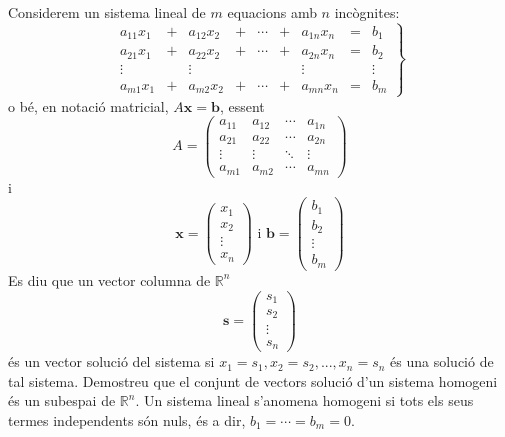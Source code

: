 \begin{exemple}
Considerem un sistema lineal de $m$ equacions amb $n$ incògnites:%
\begin{equation*}
\left. 
\begin{array}{ccccccccc}
a_{11}x_{1} & + & a_{12}x_{2} & + & \cdots & + & a_{1n}x_{n} & = & b_{1} \\ 
a_{21}x_{1} & + & a_{22}x_{2} & + & \cdots & + & a_{2n}x_{n} & = & b_{2} \\ 
\vdots &  & \vdots &  &  &  & \vdots &  & \vdots \\ 
a_{m1}x_{1} & + & a_{m2}x_{2} & + & \cdots & + & a_{mn}x_{n} & = & b_{m}%
\end{array}%
\right\}
\end{equation*}%
o bé, en notació matricial, $A\mathbf{x}=\mathbf{b}$, essent%
\begin{equation*}
A=\left( 
\begin{array}{cccc}
a_{11} & a_{12} & \cdots & a_{1n} \\ 
a_{21} & a_{22} & \cdots & a_{2n} \\ 
\vdots & \vdots & \ddots & \vdots \\ 
a_{m1} & a_{m2} & \cdots & a_{mn}%
\end{array}%
\right)
\end{equation*}%
i%
\begin{equation*}
\mathbf{x}=\left( 
\begin{array}{c}
x_{1} \\ 
x_{2} \\ 
\vdots \\ 
x_{n}%
\end{array}%
\right) \text{ \ \ \ i \ \ \ }\mathbf{b}=\left( 
\begin{array}{c}
b_{1} \\ 
b_{2} \\ 
\vdots \\ 
b_{m}%
\end{array}%
\right)
\end{equation*}%
Es diu que un vector columna de $\mathbb{R}^{n}$ 
\begin{equation*}
\mathbf{s}=\left( 
\begin{array}{c}
s_{1} \\ 
s_{2} \\ 
\vdots \\ 
s_{n}%
\end{array}%
\right)
\end{equation*}%
és un vector solució del sistema si $%
x_{1}=s_{1},x_{2}=s_{2},...,x_{n}=s_{n}$ és una solució de tal sistema.
Demostreu que el conjunt de vectors solució d’un sistema homogeni és un subespai de $\mathbb{R}^{n}$. Un sistema lineal s’anomena homogeni si tots els seus termes independents són nuls, és a dir, $%
b_{1}=\cdots =b_{m}=0$.

\end{exemple}
